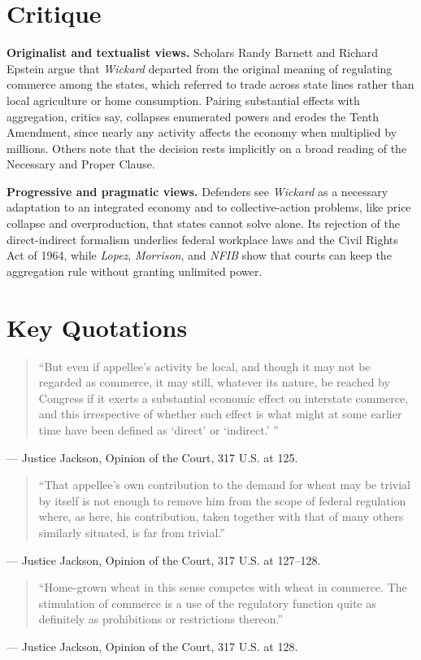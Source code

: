 \documentclass[12pt]{article}
\begin{document}
\section{Critique}

\textbf{Originalist and textualist views.} Scholars Randy Barnett and Richard Epstein argue that \textit{Wickard} departed from the original meaning of regulating commerce among the states, which referred to trade across state lines rather than local agriculture or home consumption. Pairing substantial effects with aggregation, critics say, collapses enumerated powers and erodes the Tenth Amendment, since nearly any activity affects the economy when multiplied by millions. Others note that the decision rests implicitly on a broad reading of the Necessary and Proper Clause.

\textbf{Progressive and pragmatic views.} Defenders see \textit{Wickard} as a necessary adaptation to an integrated economy and to collective-action problems, like price collapse and overproduction, that states cannot solve alone. Its rejection of the direct-indirect formalism underlies federal workplace laws and the Civil Rights Act of 1964, while \textit{Lopez}, \textit{Morrison}, and \textit{NFIB} show that courts can keep the aggregation rule without granting unlimited power.

\section{Key Quotations}

\begin{quote}
``But even if appellee's activity be local, and though it may not be regarded as commerce, it may still, whatever its nature, be reached by Congress if it exerts a substantial economic effect on interstate commerce, and this irrespective of whether such effect is what might at some earlier time have been defined as `direct' or `indirect.' ''
\end{quote}
\noindent --- Justice Jackson, Opinion of the Court, 317 U.S. at 125.

\begin{quote}
``That appellee's own contribution to the demand for wheat may be trivial by itself is not enough to remove him from the scope of federal regulation where, as here, his contribution, taken together with that of many others similarly situated, is far from trivial.''
\end{quote}
\noindent --- Justice Jackson, Opinion of the Court, 317 U.S. at 127--128.

\begin{quote}
``Home-grown wheat in this sense competes with wheat in commerce. The stimulation of commerce is a use of the regulatory function quite as definitely as prohibitions or restrictions thereon.''
\end{quote}
\noindent --- Justice Jackson, Opinion of the Court, 317 U.S. at 128.
\end{document}
